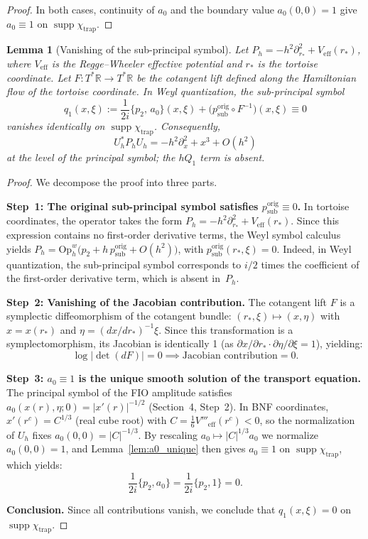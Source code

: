 \documentclass[12pt,a4paper]{amsart}
\newtheorem{lemma}[theorem]{Lemma}
\theoremstyle{remark}
\begin{document}
\begin{proof}
In both cases, continuity of $a_0$ and the boundary value $a_0(0,0) = 1$
give $a_0 \equiv 1$ on $\operatorname{supp}\chi_{\mathrm{trap}}$.
\end{proof}

\begin{lemma}[Vanishing of the sub-principal symbol]
\label{lem:Q1}
Let $P_h = -h^2\partial_{r_*}^2 + V_{\mathrm{eff}}(r_*)$, where $V_{\mathrm{eff}}$ is the
Regge--Wheeler effective potential and $r_*$ is the tortoise coordinate. Let
$F: T^*\mathbb{R} \to T^*\mathbb{R}$ be the cotangent lift defined along the Hamiltonian flow of
the tortoise coordinate. In Weyl quantization, the sub-principal symbol
\[
  q_1(x,\xi) :=
  \frac{1}{2i}\bigl\{p_2,\, a_0\bigr\}(x,\xi)
  + \bigl(p^{\mathrm{orig}}_{\mathrm{sub}} \circ F^{-1}\bigr)(x,\xi) \equiv 0
\]
vanishes identically on $\operatorname{supp}\chi_{\mathrm{trap}}$. Consequently,
\[
  U_h^* P_h U_h = -h^2\partial_x^2 + x^3 + O(h^2)
\]
at the level of the principal symbol; the $hQ_1$ term is absent.
\end{lemma}

\begin{proof}
We decompose the proof into three parts.

\textbf{Step~1: The original sub-principal symbol satisfies $p^{\mathrm{orig}}_{\mathrm{sub}} \equiv 0$.}
In tortoise coordinates, the operator takes the form
$P_h = -h^2\partial_{r_*}^2 + V_{\mathrm{eff}}(r_*)$.
Since this expression contains no first-order derivative terms, the Weyl
symbol calculus yields
$P_h = \mathrm{Op}^w_h\bigl(p_2 + h\,p^{\mathrm{orig}}_{\mathrm{sub}} + O(h^2)\bigr)$,
with $p^{\mathrm{orig}}_{\mathrm{sub}}(r_*,\xi) = 0$. Indeed, in Weyl quantization, the sub-principal symbol
corresponds to $i/2$ times the coefficient of the first-order derivative term, which is
absent in~$P_h$.

\textbf{Step~2: Vanishing of the Jacobian contribution.}
The cotangent lift $F$ is a symplectic diffeomorphism of the cotangent bundle:
$(r_*,\xi) \mapsto (x,\eta)$ with $x = x(r_*)$ and $\eta = (dx/dr_*)^{-1}\xi$. Since
this transformation is a symplectomorphism, its Jacobian is identically 1 (as
$\partial x/\partial r_* \cdot \partial\eta/\partial\xi = 1$), yielding:
\[
  \log\bigl|\det(dF)\bigr| = 0 \implies \text{Jacobian contribution} = 0.
\]

\textbf{Step~3: $a_0 \equiv 1$ is the unique smooth solution of the transport equation.}
The principal symbol of the FIO amplitude satisfies
$a_0(x(r),\eta;0) = |x'(r)|^{-1/2}$ (Section~4, Step~2).
In BNF coordinates, $x'(r^c) = C^{1/3}$ (real cube root) with
$C = \tfrac{1}{6}V'''_{\mathrm{eff}}(r^c) < 0$,
so the normalization of $U_h$ fixes $a_0(0,0) = |C|^{-1/3}$.
By rescaling $a_0 \mapsto |C|^{1/3} a_0$ we normalize $a_0(0,0) = 1$,
and Lemma~\ref{lem:a0_unique} then gives $a_0 \equiv 1$
on $\operatorname{supp}\chi_{\mathrm{trap}}$, which yields:
\[
  \frac{1}{2i}\{p_2, a_0\} = \frac{1}{2i}\{p_2, 1\} = 0.
\]

\textbf{Conclusion.} { Since all contributions vanish, we conclude that
$q_1(x,\xi) = 0$ on $\operatorname{supp}\chi_{\mathrm{trap}}$.}
\end{proof}
\end{document}
